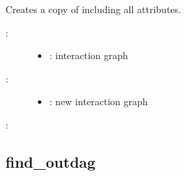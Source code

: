 \documentclass[letterpaper,10pt,english]{sphinxmanual}
\begin{document}
\begin{fulllineitems}
\label{\detokenize{InteractionGraphs:PyBoolNet.InteractionGraphs.copy}}
Creates a copy of  including all  attributes.
\begin{description}
\item[{:}] \leavevmode\begin{itemize}
\item {} 
: interaction graph

\end{itemize}

\item[{:}] \leavevmode\begin{itemize}
\item {} 
: new interaction graph

\end{itemize}

\end{description}

:

\begin{sphinxVerbatim}[commandchars=\\\{\}]
  
\end{sphinxVerbatim}

\end{fulllineitems}



\subsection{find\_outdag}
\label{\detokenize{InteractionGraphs:find-outdag}}\label{\detokenize{InteractionGraphs:id3}}
\end{document}
